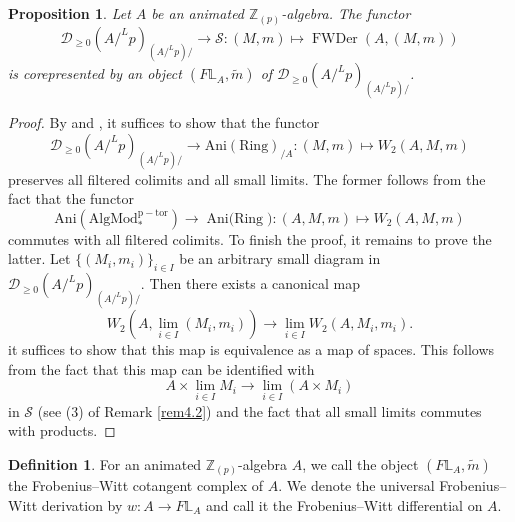 \documentclass[11pt, a4paper]{amsart}
\theoremstyle{plain}
\newtheorem{prop}[theorem]{Proposition}
\theoremstyle{definition}
\newtheorem{definition}[theorem]{Definition}
\begin{document}
\begin{prop}\label{pro4.7}
    Let $A$ be an animated $\mathbb Z_{(p)}$-algebra. The functor \[\mathcal D_{\ge0}(A/^Lp)_{(A/^Lp)/}\to \mathcal S:(M,m)\mapsto \operatorname{FWDer}(A,(M,m))\] is corepresented by an object $(F\mathbb L_A,\widetilde m)$ of $\mathcal D_{\ge0}(A/^Lp)_{(A/^Lp)/}$.
\end{prop}
\begin{proof}
    By \cite[Proposition 5.5.2.7]{Lur09} \cite[Tag 06L4]{Lur26} and \cite[Tag 06LA]{Lur26}, it suffices to show that the functor \[\mathcal D_{\ge0}(A/^Lp)_{(A/^Lp)/}\to \operatorname{Ani(Ring)}_{/A}:(M,m)\mapsto W_2(A,M,m)\] preserves all filtered colimits and all small limits. The former follows from the fact that the functor \[\operatorname{Ani(AlgMod_*^{p-tor})}\to \operatorname{Ani(Ring}):(A,M,m)\mapsto W_2(A,M,m)\] commutes with all filtered colimits. To finish the proof, it remains to prove the latter. Let $\{(M_i,m_i)\}_{i\in I}$ be an arbitrary small diagram in $\mathcal D_{\ge0}(A/^Lp)_{(A/^Lp)/}$. Then there exists a canonical map \[W_2(A,\operatorname{lim}_{i\in I}(M_i,m_i))\to \operatorname{lim}_{i\in I}W_2(A,M_i,m_i).\] it suffices to show that this map is equivalence as a map of spaces. This follows from the fact that this map can be identified with \[A\times \operatorname{lim}_{i\in I}M_i\to \operatorname{lim}_{i\in I}(A\times M_i)\] in $\mathcal S$ (see (3) of Remark \ref{rem4.2}) and the fact that all small limits commutes with products.
\end{proof}


\begin{definition}\label{def4.8}
    For an animated $\mathbb Z_{(p)}$-algebra $A$, we call the object $(F\mathbb L_A,\widetilde m)$ the Frobenius--Witt cotangent complex of $A$. We denote the universal Frobenius--Witt derivation by $w:A\to F\mathbb L_A$ and call it the Frobenius--Witt differential on $A$.
\end{definition}
\end{document}
